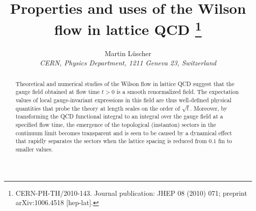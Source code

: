 \documentclass[11pt]{article}
\title{Properties and uses of the Wilson flow in lattice QCD%
\thanks{CERN-PH-TH/2010-143. Journal publication:
JHEP 08 (2010) 071; preprint arXiv:1006.4518 [hep-lat].}}
\author{Martin L\"uscher\\[1ex]
\normalsize\itshape CERN, Physics Department, 1211 Geneva 23, Switzerland}
\date{}
\begin{document}
\maketitle

\begin{abstract}
Theoretical and numerical studies of the Wilson flow
in lattice QCD suggest that the gauge field obtained
at flow time $t>0$ is a smooth renormalized field.
The expectation values of local gauge-invariant
expressions in this field are thus well-defined physical quantities
that probe the theory at length scales on the order of $\sqrt{t}$.
Moreover, by transforming the QCD functional
integral to an integral over the gauge field at a specified
flow time, the emergence of the topological (instanton)
sectors in the continuum limit becomes transparent and
is seen to be caused by a dynamical effect that
rapidly separates the sectors
when the lattice spacing is reduced from $0.1$ fm
to smaller values.
\end{abstract}







\end{document}
